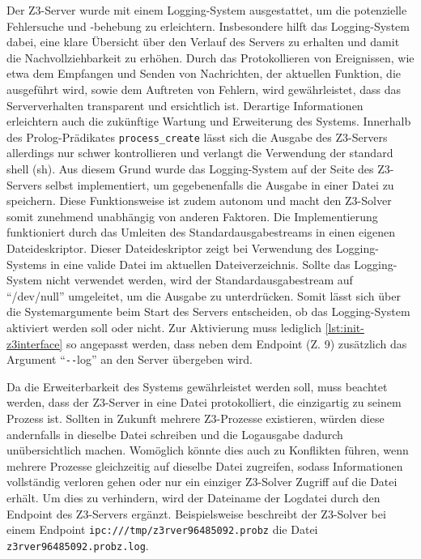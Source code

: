 Der Z3-Server wurde mit einem Logging-System ausgestattet, um die potenzielle Fehlersuche und -behebung zu erleichtern.
Insbesondere hilft das Logging-System dabei, eine klare Übersicht über den Verlauf des Servers zu erhalten und damit die Nachvollziehbarkeit zu erhöhen.
Durch das Protokollieren von Ereignissen, wie etwa dem Empfangen und Senden von Nachrichten, der aktuellen Funktion, die ausgeführt wird, sowie dem Auftreten von Fehlern,
wird gewährleistet, dass das Serververhalten transparent und ersichtlich ist.
Derartige Informationen erleichtern auch die zukünftige Wartung und Erweiterung des Systems.
Innerhalb des Prolog-Prädikates \texttt{process\_create} lässt sich die Ausgabe des Z3-Servers allerdings nur schwer kontrollieren und verlangt die Verwendung der standard shell (sh).
Aus diesem Grund wurde das Logging-System auf der Seite des Z3-Servers selbst implementiert, um gegebenenfalls die Ausgabe in einer Datei zu speichern.
Diese Funktionsweise ist zudem autonom und macht den Z3-Solver somit zunehmend unabhängig von anderen Faktoren.
Die Implementierung funktioniert durch das Umleiten des Standardausgabestreams in einen eigenen Dateideskriptor.
Dieser Dateideskriptor zeigt bei Verwendung des Logging-Systems in eine valide Datei im aktuellen Dateiverzeichnis.
Sollte das Logging-System nicht verwendet werden, wird der Standardausgabestream auf \enquote{/dev/null} umgeleitet, um die Ausgabe zu unterdrücken.
Somit lässt sich über die Systemargumente beim Start des Servers entscheiden, ob das Logging-System aktiviert werden soll oder nicht.
Zur Aktivierung muss lediglich \cref{lst:init-z3interface} so angepasst werden, dass neben dem Endpoint (Z. 9) zusätzlich das Argument \enquote{\texttt{-}\texttt{-}log} an den Server übergeben wird.

Da die Erweiterbarkeit des Systems gewährleistet werden soll, muss beachtet werden, dass der Z3-Server in eine Datei protokolliert, die einzigartig zu seinem Prozess ist.
Sollten in Zukunft mehrere Z3-Prozesse existieren, würden diese andernfalls in dieselbe Datei schreiben und die Logausgabe dadurch unübersichtlich machen.
Womöglich könnte dies auch zu Konflikten führen, wenn mehrere Prozesse gleichzeitig auf dieselbe Datei zugreifen, sodass Informationen vollständig verloren gehen oder nur ein einziger Z3-Solver Zugriff auf die Datei erhält.
Um dies zu verhindern, wird der Dateiname der Logdatei durch den Endpoint des Z3-Servers ergänzt.
Beispielsweise beschreibt der Z3-Solver bei einem Endpoint \texttt{ipc:///tmp/z3rver96485092.probz} die Datei \texttt{z3rver96485092.probz.log}.


